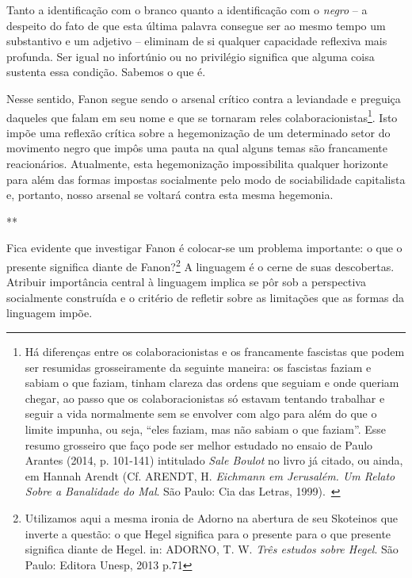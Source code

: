 Tanto a identificação com o branco quanto a identificação com o
\emph{negro} -- a despeito do fato de que esta última palavra consegue
ser ao mesmo tempo um substantivo e um adjetivo -- eliminam de si
qualquer capacidade reflexiva mais profunda. Ser igual no infortúnio ou
no privilégio significa que alguma coisa sustenta essa condição. Sabemos
o que é.

Nesse sentido, Fanon segue sendo o arsenal crítico contra a leviandade e
preguiça daqueles que falam em seu nome e que se tornaram reles
colaboracionistas\footnote{Há diferenças entre os colaboracionistas e os
  francamente fascistas que podem ser resumidas grosseiramente da
  seguinte maneira: os fascistas faziam e sabiam o que faziam, tinham
  clareza das ordens que seguiam e onde queriam chegar, ao passo que os
  colaboracionistas só estavam tentando trabalhar e seguir a vida
  normalmente sem se envolver com algo para além do que o limite
  impunha, ou seja, ``eles faziam, mas não sabiam o que faziam''. Esse
  resumo grosseiro que faço pode ser melhor estudado no ensaio de Paulo
  Arantes (2014, p. 101-141) intitulado \emph{Sale Boulot} no livro já
  citado, ou ainda, em Hannah Arendt (Cf. ARENDT, H. \emph{Eichmann em
  Jerusalém. Um Relato Sobre a Banalidade do Mal}. São Paulo: Cia das
  Letras, 1999).~}. Isto impõe uma reflexão crítica sobre a
hegemonização de um determinado setor do movimento negro que impôs uma
pauta na qual alguns temas são francamente reacionários. Atualmente,
esta hegemonização impossibilita qualquer horizonte para além das formas
impostas socialmente pelo modo de sociabilidade capitalista e, portanto,
nosso arsenal se voltará contra esta mesma hegemonia.

**

Fica evidente que investigar Fanon é colocar-se um problema importante:
o que o presente significa diante de Fanon?\footnote{Utilizamos aqui a
  mesma ironia de Adorno na abertura de seu Skoteinos que inverte a
  questão: o que Hegel significa para o presente para o que presente
  significa diante de Hegel. in: ADORNO, T. W. \emph{Três estudos sobre
  Hegel}. São Paulo: Editora Unesp, 2013 p.71} A linguagem é o cerne de
suas descobertas. Atribuir importância central à linguagem implica se
pôr sob a perspectiva socialmente construída e o critério de refletir
sobre as limitações que as formas da linguagem impõe.

